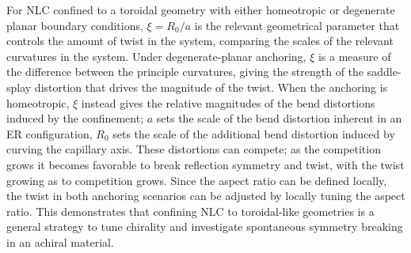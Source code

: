 For NLC confined to a toroidal geometry with either homeotropic or degenerate planar boundary conditions, $\xi = R_0/a$ is the relevant geometrical parameter that controls the amount of twist in the system, comparing the scales of the relevant curvatures in the system.
Under degenerate-planar anchoring, $\xi$ is a measure of the difference between the principle curvatures, giving the strength of the saddle-splay distortion that drives the magnitude of the twist.
When the anchoring is homeotropic, $\xi$ instead gives the relative magnitudes of the bend distortions induced by the confinement; $a$ sets the scale of the bend distortion inherent in an ER configuration, $R_0$ sets the scale of the additional bend distortion induced by curving the capillary axis.
These distortions can compete; as the competition grows it becomes favorable to break reflection symmetry and twist, with the twist growing as to competition grows.
Since the aspect ratio can be defined locally, the twist in both anchoring scenarios can be adjusted by locally tuning the aspect ratio.
This demonstrates that confining NLC to toroidal-like geometries is a general strategy to tune chirality and investigate spontaneous symmetry breaking in an achiral material.
